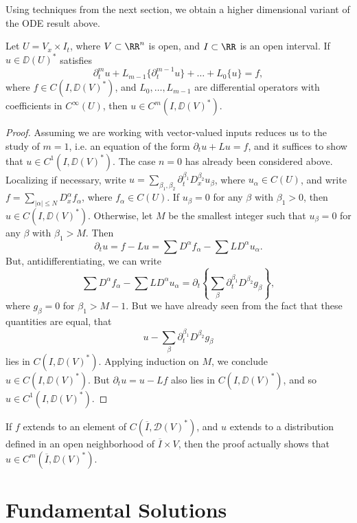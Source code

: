 Using techniques from the next section, we obtain a higher dimensional variant of the ODE result above.

\begin{theorem}
    Let $U = V_x \times I_t$, where $V \subset \RR^n$ is open, and $I \subset \RR$ is an open interval. If $u \in \DD(U)^*$ satisfies
    \[ \partial_t^m u + L_{m-1} \{ \partial_t^{m-1} u \} + \dots + L_0 \{ u \} = f, \]
    where $f \in C(I, \DD(V)^*)$, and $L_0,\dots,L_{m-1}$ are differential operators with coefficients in $C^\infty(U)$, then $u \in C^m(I,\DD(V)^*)$.
\end{theorem}
\begin{proof}
    Assuming we are working with vector-valued inputs reduces us to the study of $m = 1$, i.e. an equation of the form $\partial_t u + Lu = f$, and it suffices to show that $u \in C^1(I,\DD(V)^*)$. The case $n = 0$ has already been considered above. Localizing if necessary, write $u = \sum_{\beta_1,\beta_2} \partial_t^{\beta_1} D^{\beta_2}_x u_\beta$, where $u_\alpha \in C(U)$, and write $f = \sum_{|\alpha| \leq N} D^\alpha_x f_\alpha$, where $f_\alpha \in C(U)$. If $u_\beta = 0$ for any $\beta$ with $\beta_1 > 0$, then $u \in C(I, \DD(V)^*)$. Otherwise, let $M$ be the smallest integer such that $u_\beta = 0$ for any $\beta$ with $\beta_1 > M$. Then
    \[ \partial_t u = f - Lu = \sum D^\alpha f_\alpha - \sum L D^\alpha u_\alpha. \]
    But, antidifferentiating, we can write
    \[ \sum D^\alpha f_\alpha - \sum L D^\alpha u_\alpha = \partial_t \left\{ \sum_\beta \partial_t^{\beta_1} D^{\beta_2} g_\beta \right\}, \]
    where $g_\beta = 0$ for $\beta_1 > M-1$. But we have already seen from the fact that these quantities are equal, that
    \[ u - \sum_\beta \partial_t^{\beta_1} D^{\beta_2} g_\beta \]
    lies in $C(I,\DD(V)^*)$. Applying induction on $M$, we conclude $u \in C(I,\DD(V)^*)$. But $\partial_t u = u - Lf$ also lies in $C(I,\DD(V)^*)$, and so $u \in C^1(I,\DD(V)^*)$.
\end{proof}

\begin{remark}
    If $f$ extends to an element of $C(\overline{I}, \mathcal{D}(V)^*)$, and $u$ extends to a distribution defined in an open neighborhood of $\overline{I} \times V$, then the proof actually shows that $u \in C^m(\overline{I}, \DD(V)^*)$.
\end{remark}

\section{Fundamental Solutions}

